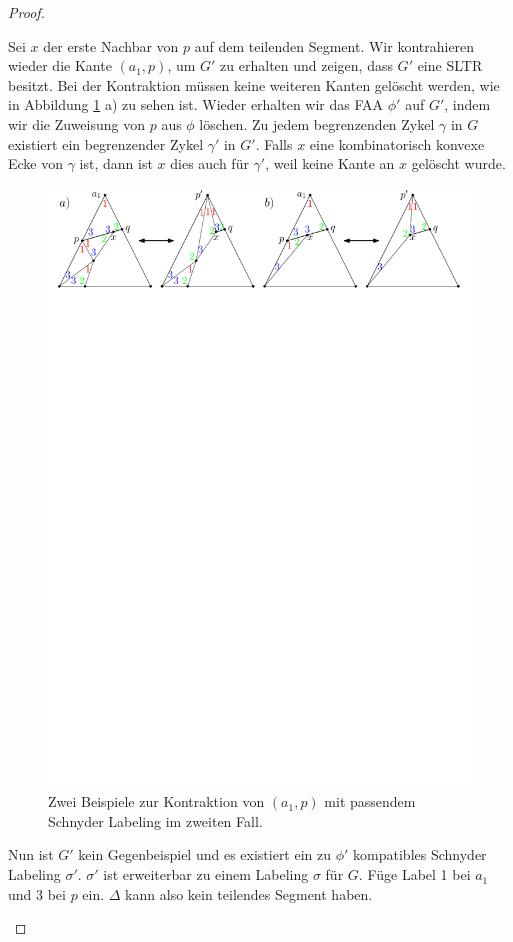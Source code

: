 \begin{proof}
\begin{description}[leftmargin =0pt, font = \rmfamily,listparindent=\parindent,parsep=0pt]
\item[Fall 2:] Sei $x$ der erste Nachbar von $p$ auf dem teilenden Segment. Wir kontrahieren wieder die Kante $(a_1,p)$, um $G'$ zu erhalten und zeigen, dass $G'$ eine SLTR besitzt. Bei der Kontraktion müssen keine weiteren Kanten gelöscht werden, wie in Abbildung \ref{pic_lem3_2} a) zu sehen ist. Wieder erhalten wir das FAA $\phi'$ auf $G'$, indem wir die Zuweisung von $p$ aus $\phi$ löschen. Zu jedem begrenzenden Zykel $\gamma$ in $G$ existiert ein begrenzender Zykel $\gamma'$ in $G'$. Falls $x$ eine kombinatorisch konvexe Ecke von $\gamma$ ist, dann ist $x$ dies auch für $\gamma'$, weil keine Kante an $x$ gelöscht wurde.

\begin{figure}
	\centering
	  \includegraphics[width=1\textwidth]{lem3_2.pdf}
    	\caption{Zwei Beispiele zur Kontraktion von $(a_1,p)$ mit passendem Schnyder Labeling im zweiten Fall.}
    	\label{pic_lem3_2}
\end{figure}

Nun ist $G'$ kein Gegenbeispiel und es existiert ein zu $\phi'$ kompatibles Schnyder Labeling $\sigma'$. $\sigma'$ ist erweiterbar zu einem Labeling $\sigma$ für $G$. Füge Label 1 bei $a_1$ und 3 bei $p$ ein. $\Delta$ kann also kein teilendes Segment haben.\qedhere
\end{description}
\end{proof}


